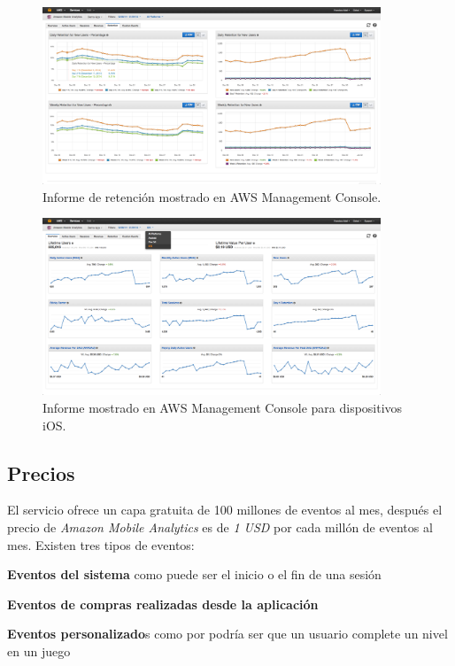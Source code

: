 \documentclass{article}
\begin{document}
\begin{figure}[h]
  \centering
    \includegraphics[width=0.9\textwidth]{img/005_Retention.png}
  \caption{Informe de retención mostrado en AWS  Management Console.}
  \label{fig:Retention}
\end{figure}


\begin{figure}[h]
  \centering
    \includegraphics[width=0.9\textwidth]{img/006_iOS.png}
  \caption{Informe mostrado en AWS  Management Console para dispositivos iOS.}
  \label{fig:OverviewIOS}
\end{figure}

\clearpage

\subsection{Precios}
	El servicio ofrece un capa gratuita de 100 millones de eventos al mes, después el precio de \emph{Amazon Mobile Analytics} es de \textit{1 USD} por cada millón de eventos al mes. Existen tres tipos de eventos:
\begin{itemize}
{\setlength{\parskip}{0mm} 
	\item \textbf{Eventos del sistema} como puede ser el inicio o el fin de una sesión
	\item \textbf{Eventos de compras realizadas desde la aplicación}
	\item \textbf{Eventos personalizado}s como por podría ser que un usuario complete un nivel en un juego	
}
\end{itemize}
\end{document}
